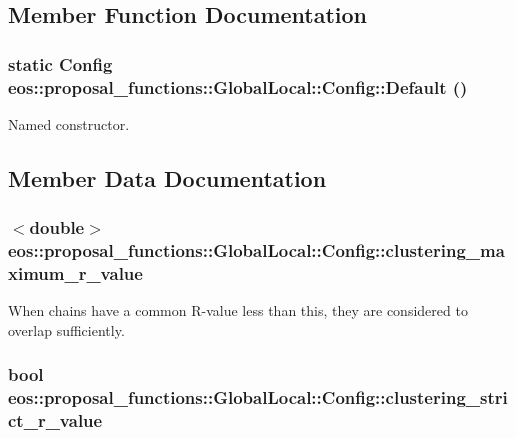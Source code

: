\subsection{Member Function Documentation}
\hypertarget{structeos_1_1proposal__functions_1_1GlobalLocal_1_1Config_ab6e85ee9aa380cdb63827bbab9e4d1c8}{
\subsubsection[{Default}]{\setlength{\rightskip}{0pt plus 5cm}static {\bf Config} eos::proposal\_\-functions::GlobalLocal::Config::Default ()}}
\label{structeos_1_1proposal__functions_1_1GlobalLocal_1_1Config_ab6e85ee9aa380cdb63827bbab9e4d1c8}


Named constructor. 

\subsection{Member Data Documentation}
\hypertarget{structeos_1_1proposal__functions_1_1GlobalLocal_1_1Config_a6632462782aaefb7279fdb34f46d6d9c}{
\subsubsection[{clustering\_\-maximum\_\-r\_\-value}]{$<$double$>$ {\bf eos::proposal\_\-functions::GlobalLocal::Config::clustering\_\-maximum\_\-r\_\-value}}}
\label{structeos_1_1proposal__functions_1_1GlobalLocal_1_1Config_a6632462782aaefb7279fdb34f46d6d9c}
When chains have a common R-\/value less than this, they are considered to overlap sufficiently. \hypertarget{structeos_1_1proposal__functions_1_1GlobalLocal_1_1Config_a9a530636287156e4ee98cb1ee2f04317}{
\subsubsection[{clustering\_\-strict\_\-r\_\-value}]{\setlength{\rightskip}{0pt plus 5cm}bool {\bf eos::proposal\_\-functions::GlobalLocal::Config::clustering\_\-strict\_\-r\_\-value}}}
\label{structeos_1_1proposal__functions_1_1GlobalLocal_1_1Config_a9a530636287156e4ee98cb1ee2f04317}


